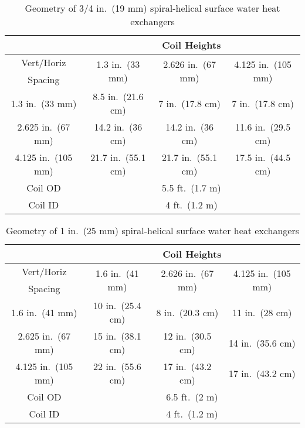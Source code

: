 	\begin{table}
	\centering
		\caption[3/4 in.\ (19 mm) spiral-helical SWHE geometry]{Geometry of 3/4 in.\ (19 mm) spiral-helical surface water heat exchangers}
		\label{tab:ExpMethod:HeatRej:Method:SWHEGeometry1}
		\begin{tabular}{|c|c|c|c|}
		\hline
		& \multicolumn{3}{|c|}{Coil Heights}\\
		\hline\hline
		Vert/Horiz & \multirow{2}{*}{1.3 in.\ (33 mm)} & \multirow{2}{*}{2.626 in.\ (67 mm)} & \multirow{2}{*}{4.125 in.\ (105 mm)} \\
		Spacing &  &  &  \\
		\hline
		1.3 in.\ (33 mm) & 8.5 in.\ (21.6 cm) & 7 in.\ (17.8 cm) & 7 in.\ (17.8 cm) \\
		\hline
		2.625 in.\ (67 mm) & 14.2 in.\ (36 cm) & 14.2 in.\ (36 cm) & 11.6 in.\ (29.5 cm) \\
		\hline
		4.125 in.\ (105 mm) & 21.7 in.\ (55.1 cm) & 21.7 in.\ (55.1 cm) & 17.5 in.\ (44.5 cm) \\
		\hline\hline
		Coil OD & \multicolumn{3}{|c|}{5.5 ft.\ (1.7 m)} \\
		\hline
		Coil ID & \multicolumn{3}{|c|}{4 ft.\ (1.2 m)}\\
		\hline
		\end{tabular}
	\end{table}

	\begin{table}
	\centering
		\caption[1 in.\ (25 mm) spiral-helical SWHE geometry]{Geometry of 1 in.\ (25 mm) spiral-helical surface water heat exchangers}
		\label{tab:ExpMethod:HeatRej:Method:SWHEGeometry2}
		\begin{tabular}{|c|c|c|c|}
		\hline
		& \multicolumn{3}{|c|}{Coil Heights}\\
		\hline\hline
		Vert/Horiz & \multirow{2}{*}{1.6 in.\ (41 mm)} & \multirow{2}{*}{2.626 in.\ (67 mm)} & \multirow{2}{*}{4.125 in.\ (105 mm)} \\
		Spacing &  &  &  \\
		\hline
		1.6 in.\ (41 mm) & 10 in.\ (25.4 cm) & 8 in.\ (20.3 cm) & 11 in.\ (28 cm) \\
		\hline
		2.625 in.\ (67 mm) & 15 in.\ (38.1 cm) & 12 in.\ (30.5 cm) & 14 in.\ (35.6 cm) \\
		\hline
		4.125 in.\ (105 mm) & 22 in.\ (55.6 cm) & 17 in.\ (43.2 cm) & 17 in.\ (43.2 cm) \\
		\hline\hline
		Coil OD & \multicolumn{3}{|c|}{6.5 ft.\ (2 m)} \\
		\hline
		Coil ID & \multicolumn{3}{|c|}{4 ft.\ (1.2 m)}\\
		\hline
		\end{tabular}
	\end{table}

